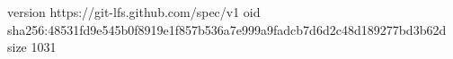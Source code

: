 version https://git-lfs.github.com/spec/v1
oid sha256:48531fd9e545b0f8919e1f857b536a7e999a9fadcb7d6d2c48d189277bd3b62d
size 1031

